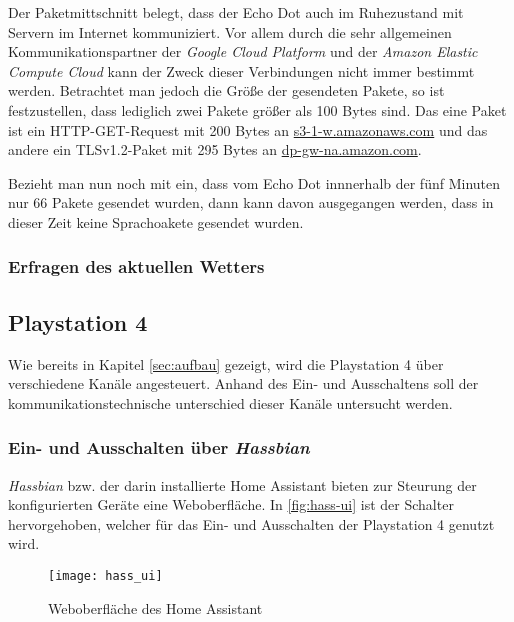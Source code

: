 Der Paketmittschnitt belegt, dass der Echo Dot auch im Ruhezustand mit Servern im Internet kommuniziert.
Vor allem durch die sehr allgemeinen Kommunikationspartner der \textit{Google Cloud Platform} und der \textit{Amazon Elastic Compute Cloud}
kann der Zweck dieser Verbindungen nicht immer bestimmt werden.
Betrachtet man jedoch die Größe der gesendeten Pakete, so ist festzustellen,
dass lediglich zwei Pakete größer als 100 Bytes sind.
Das eine Paket ist ein HTTP-GET-Request mit 200 Bytes an \url{s3-1-w.amazonaws.com} und
das andere ein TLSv1.2-Paket mit 295 Bytes an \url{dp-gw-na.amazon.com}.

Bezieht man nun noch mit ein, dass vom Echo Dot innnerhalb der fünf Minuten nur 66 Pakete gesendet wurden,
dann kann davon ausgegangen werden, dass in dieser Zeit keine Sprachoakete gesendet wurden.

\subsubsection{Erfragen des aktuellen Wetters}


\subsection{Playstation 4}
Wie bereits in Kapitel \ref{sec:aufbau} \textit{} gezeigt, wird die Playstation 4 über verschiedene Kanäle angesteuert.
Anhand des Ein- und Ausschaltens soll der kommunikationstechnische unterschied dieser Kanäle untersucht werden.

\subsubsection{Ein- und Ausschalten über \textit{Hassbian}}
\textit{Hassbian} bzw. der darin installierte Home Assistant bieten zur Steurung der konfigurierten Geräte eine Weboberfläche.
In \autoref{fig:hass-ui} ist der Schalter hervorgehoben, welcher für das Ein- und Ausschalten der Playstation 4 genutzt wird.

\begin{figure}[h!]
    \centering
    \texttt{[image: hass\_ui]}
    \caption{Weboberfläche des Home Assistant}\label{fig:hass-ui}
\end{figure}


